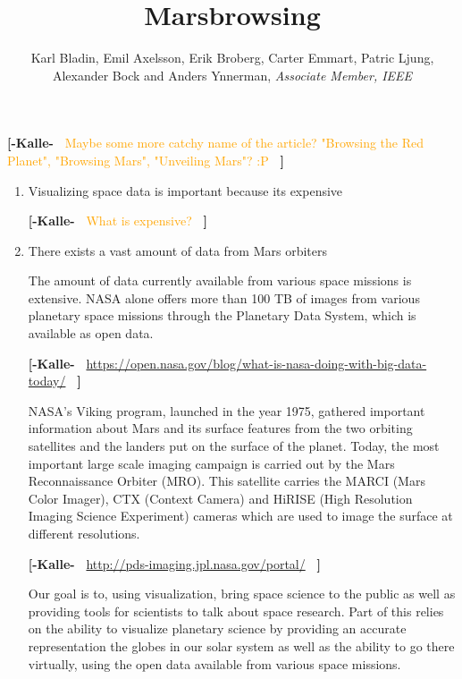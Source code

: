 \documentclass[journal]{vgtc}                %
\title{Marsbrowsing}
\author{Karl Bladin, Emil Axelsson, Erik Broberg, Carter Emmart, Patric Ljung, \\ Alexander Bock and Anders Ynnerman, \textit{Associate Member, IEEE}}
\newcommand{\kallecomment}[1]{\textbf{[-Kalle-~}
    \textcolor{orange}{#1}
    \textbf{~]}}
\begin{document}

 \label{sec:introduction}
\maketitle
\kallecomment{Maybe some more catchy name of the article? "Browsing the Red Planet", "Browsing Mars", "Unveiling Mars"? :P}

\begin{enumerate}
\item Visualizing space data is important because its expensive

\kallecomment{What is expensive?}

\item There exists a vast amount of data from Mars orbiters

The amount of data currently available from various space missions is extensive.
NASA alone offers more than 100 TB of images from various planetary space missions through the Planetary Data System, which is available as open data.

\kallecomment{\url{https://open.nasa.gov/blog/what-is-nasa-doing-with-big-data-today/}}

NASA's Viking program, launched in the year 1975, gathered important information about Mars and its surface features from the two orbiting satellites and the landers put on the surface of the planet.
Today, the most important large scale imaging campaign is carried out by the Mars Reconnaissance Orbiter (MRO).
This satellite carries the MARCI (Mars Color Imager), CTX (Context Camera) and HiRISE (High Resolution Imaging Science Experiment) cameras which are used to image the surface at different resolutions.

\kallecomment{\url{http://pds-imaging.jpl.nasa.gov/portal/}}

Our goal is to, using visualization, bring space science to the public as well as providing tools for scientists to talk about space research.
Part of this relies on the ability to visualize planetary science by providing an accurate representation the globes in our solar system as well as the ability to go there virtually, using the open data available from various space missions.


\end{enumerate}
\end{document}

